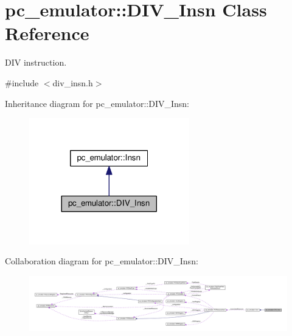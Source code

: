\hypertarget{classpc__emulator_1_1DIV__Insn}{}\section{pc\+\_\+emulator\+:\+:D\+I\+V\+\_\+\+Insn Class Reference}
\label{classpc__emulator_1_1DIV__Insn}


D\+IV instruction.  




{\ttfamily \#include $<$div\+\_\+insn.\+h$>$}



Inheritance diagram for pc\+\_\+emulator\+:\+:D\+I\+V\+\_\+\+Insn\+:\nopagebreak
\begin{figure}[H]
\begin{center}
\leavevmode
\includegraphics[width=197pt]{classpc__emulator_1_1DIV__Insn__inherit__graph}
\end{center}
\end{figure}


Collaboration diagram for pc\+\_\+emulator\+:\+:D\+I\+V\+\_\+\+Insn\+:\nopagebreak
\begin{figure}[H]
\begin{center}
\leavevmode
\includegraphics[width=350pt]{classpc__emulator_1_1DIV__Insn__coll__graph}
\end{center}
\end{figure}
